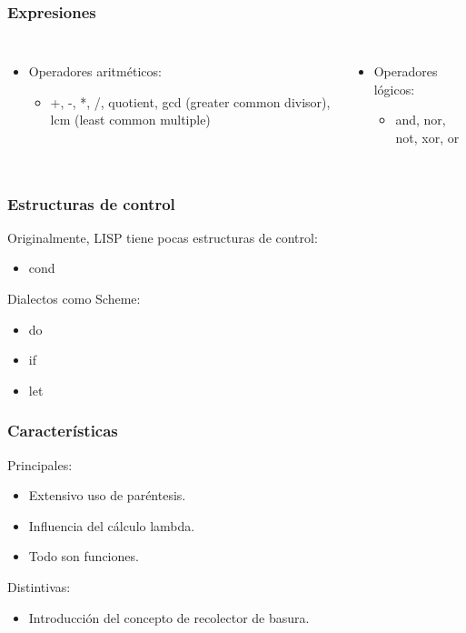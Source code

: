 \documentclass{beamer}
\begin{document}
\begin{frame}
\frametitle{Expresiones}
\begin{columns}[c] %

\begin{itemize}
  \item Operadores aritm\'eticos:
    \begin{itemize}
      \item +, -, *, /, quotient, gcd (greater common divisor), lcm (least common multiple)
    \end{itemize}
\end{itemize}


\begin{itemize}
  \item Operadores l\'ogicos:
  \begin{itemize}
    \item and, nor, not, xor, or
  \end{itemize}
\end{itemize}
\end{columns}
\end{frame}

\begin{frame}
\frametitle{Estructuras de control}
Originalmente, LISP tiene pocas estructuras de control:
\begin{itemize}
  \item cond
\end{itemize}

Dialectos como Scheme:
\begin{itemize}
  \item do
  \item if
  \item let
\end{itemize}
\end{frame}


\begin{frame}
\frametitle{Caracter\'isticas}
Principales:
\begin{itemize}
  \item Extensivo uso de par\'entesis.
  \item Influencia del c\'alculo lambda.
  \item Todo son funciones.
\end{itemize}

Distintivas:
\begin{itemize}
  \item Introducci\'on del concepto de recolector de basura. 
\end{itemize}
\end{frame}
\end{document}
